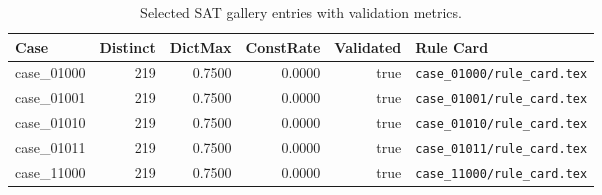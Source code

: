 \begin{table}[t]
\centering
\small
\begin{tabular}{lrrrrl}
\toprule
Case & Distinct & DictMax & ConstRate & Validated & Rule Card \\
\midrule
case\_01000 & 219 & 0.7500 & 0.0000 & true & \texttt{case\_01000/rule\_card.tex} \\
case\_01001 & 219 & 0.7500 & 0.0000 & true & \texttt{case\_01001/rule\_card.tex} \\
case\_01010 & 219 & 0.7500 & 0.0000 & true & \texttt{case\_01010/rule\_card.tex} \\
case\_01011 & 219 & 0.7500 & 0.0000 & true & \texttt{case\_01011/rule\_card.tex} \\
case\_11000 & 219 & 0.7500 & 0.0000 & true & \texttt{case\_11000/rule\_card.tex} \\
\bottomrule
\end{tabular}
\caption{Selected SAT gallery entries with validation metrics.}
\label{tab:sen24-gallery}
\end{table}
